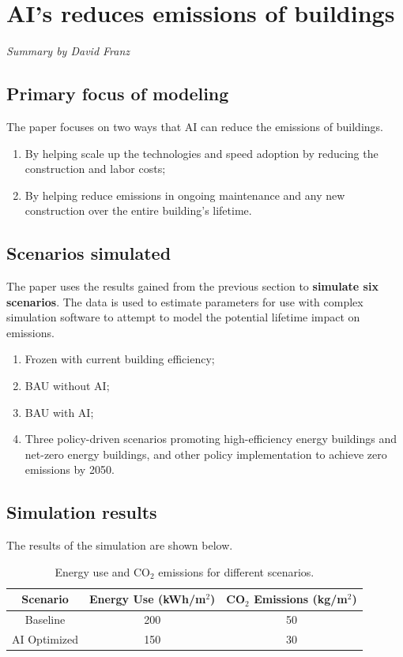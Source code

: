 \documentclass[conference,a4paper]{IEEEtran}
\begin{document}
\section*{AI's reduces emissions of buildings}
\textit{Summary by David Franz}

\subsection*{Primary focus of modeling}

The paper focuses on two ways that AI can reduce the emissions of buildings.

\begin{enumerate}
    \item By helping scale up the technologies and speed adoption by reducing the construction and labor costs;
    \item By helping reduce emissions in ongoing maintenance and any new construction over the entire building's lifetime.
\end{enumerate}

\subsection*{Scenarios simulated}
The paper uses the results gained from the previous section to \textbf{simulate six scenarios}. The data is used to estimate parameters for use with complex simulation software to attempt to model the potential lifetime impact on emissions.
\begin{enumerate}
    \item Frozen with current building efficiency;
    \item BAU without AI;
    \item BAU with AI;
    \item Three policy-driven scenarios promoting high-efficiency energy buildings and net-zero energy buildings, and other policy implementation to achieve zero emissions by 2050.
\end{enumerate}


\subsection*{Simulation results}
The results of the simulation are shown below.

\begin{table}
\centering
\begin{tabular}{|c|c|c|}
\hline
\textbf{Scenario} & \textbf{Energy Use (kWh/m$^2$)} & \textbf{CO$_2$ Emissions (kg/m$^2$)} \\
\hline 
Baseline & 200 & 50 \\
\hline
AI Optimized & 150 & 30 \\
\hline
\end{tabular}
\caption{Energy use and CO$_2$ emissions for different scenarios.}
\label{tab:energy-emissions}
\end{table}
\end{document}
